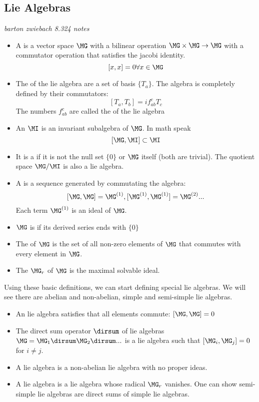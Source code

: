 \documentclass[11pt]{scrartcl}
\begin{document}
\subsection{Lie Algebras}
\emph{barton zwiebach 8.324 notes}
\begin{definition}
	\begin{itemize}
		\item A  is a vector space $\MG$ with a bilinear operation $\MG \times \MG \rightarrow \MG$ with a commutator operation that satisfies the jacobi identity.
		\[ [x, x] = 0 \forall x \in \MG \]
		\item The  of the lie algebra are a set of basis $\{ T_{a} \}$.   The algebra is completely defined by their commutators:
		\[ [T_a, T_b] = if_{ab}^c T_c \]
		The numbers $f_{ab}^c$ are called the  of the lie algebra
		\item An  $\MI$ is an invariant subalgebra of $\MG$. In math speak $$ [\MG, \MI] \subset \MI$$
		\item It is a  if it is not the null set $\{ 0\}$ or $\MG$ itself (both are trivial).  The quotient space $\MG /  \MI$ is also a lie algebra.
		\item  A  is a sequence generated by commutating the algebra:
		\[ [\MG, \MG] = \MG^{(1)}, [\MG^{(1)}, \MG^{(1)}] = \MG^{(2)} ... \]
		Each term $\MG^{(1)}$ is an ideal of $\MG$.
		\item $\MG$ is   if its derived series ends with $\{ 0 \}$
		\item The  of $\MG$ is the set of all non-zero elements of $\MG$ that commutes with every element in $\MG$.
		\item The  $\MG_r$ of $\MG$ is the maximal solvable ideal.
	\end{itemize}
\end{definition}

Using these basic definitions, we can start defining special lie algebras.  We will see there are abelian and non-abelian, simple and semi-simple lie algebras.

\begin{definition}
	\begin{itemize}
		\item An  lie algebra satisfies that all elements commute: $[\MG, \MG] = 0$
		\item The direct sum operator $\dirsum$ of lie algebras $\MG= \MG_1 \dirsum \MG_2 \dirsum ...$ is a lie algebra such that $[\MG_i, \MG_j] = 0 $ for $i \neq j$.
		\item A  lie algebra is a non-abelian lie algebra with no proper ideas.
		\item A  lie algebra is a lie algebra whose radical $\MG_r$ vanishes.  One can show semi-simple lie algebras are direct sums of simple lie algebras.
	\end{itemize}
\end{definition}
\end{document}
